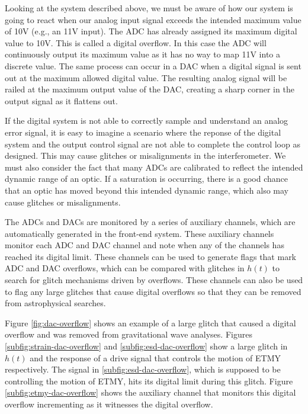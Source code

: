 Looking at the system described above, we must be aware of how our system 
is going to react when our analog input signal exceeds the intended maximum 
value of 10V (e.g., an 11V input). The ADC has already assigned its maximum 
digital value to 10V. This is called a digital overflow. In this case the ADC 
will continuously output its maximum value as it has no way to map 11V into 
a discrete value. The same process can occur in a DAC when a digital signal 
is sent out at the maximum allowed digital value. The resulting analog signal 
will be railed at the maximum output value of the DAC, creating a sharp corner 
in the output signal as it flattens out. 

If the digital system is not able to correctly sample and understand an analog 
error signal, it is easy to imagine a scenario where the reponse of the digital 
system and the output control signal are not able to complete the control loop 
as designed. This may cause glitches or misalignments in the interferometer.
We must also consider the fact that many ADCs are calibrated to reflect the 
intended dynamic range of an optic.  If a saturation is occurring, there is 
a good chance that an optic has moved beyond this intended dynamic range, which 
also may cause glitches or misalignments.

The ADCs and DACs are monitored by a series of auxiliary channels, which are 
automatically generated in the front-end system. These auxiliary channels 
monitor each ADC and DAC channel and note when any of the channels has reached 
its digital limit. These channels can be used to generate flags that mark 
ADC and DAC overflows, which can be compared with glitches in $h(t)$ to 
search for glitch mechanisms driven by overflows. These channels can also 
be used to flag any large glitches that cause digital overflows so that they 
can be removed from astrophysical searches. 

Figure \ref{fig:dac-overflow} shows an example of a large glitch that caused 
a digital overflow and was removed from gravitational wave analyses. Figures 
\ref{subfig:strain-dac-overflow} and \ref{subfig:esd-dac-overflow} show a 
large glitch in $h(t)$ and the response of a drive signal that controls 
the motion of ETMY respectively. The signal in \ref{subfig:esd-dac-overflow}, 
which is supposed to be controlling the motion of ETMY, hits its digital 
limit during this glitch. Figure \ref{subfig:etmy-dac-overflow} shows the 
auxiliary channel that monitors this digital overflow incrementing as 
it witnesses the digital overflow. 

